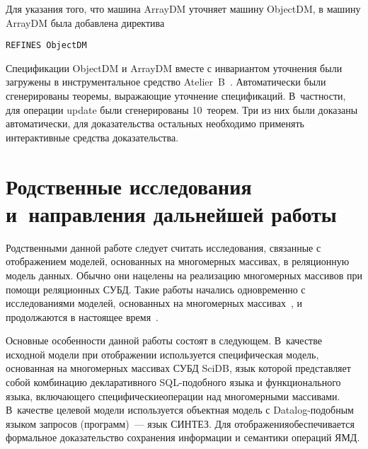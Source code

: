 \begin{multicols}{2}
                        \vspace*{-6pt}
        
        Для указания того, что машина {\sf ArrayDM} уточняет машину 
{\sf ObjectDM}, в машину {\sf ArrayDM} была добавлена директива
        \begin{verbatim}
REFINES ObjectDM
\end{verbatim}


        Спецификации {\sf ObjectDM} и {\sf ArrayDM} вместе с инвариантом 
уточнения были загружены в инструментальное средство 
        Atelier~B~\cite{22-stu}. Автоматически были сгенерированы теоремы, 
выражающие уточнение спецификаций. В~частности, для операции {\sf update} 
были сгенерированы 10~тео\-рем. Три из них были доказаны автоматически, 
для доказательства остальных необходимо применять интерактивные средства 
доказательства.

\vspace*{-9pt}
  
\section{Родственные исследования и~направления дальнейшей 
работы}

\vspace*{-2pt}

        Родственными данной работе следует считать исследования, связанные с 
отображением моделей, основанных на многомерных массивах, в реляционную 
модель данных. Обычно они нацелены на реализацию многомерных массивов 
при помощи реляционных СУБД. Такие работы начались одновременно с 
исследованиями моделей, основанных на многомерных массивах~\cite{5-stu}, и 
продолжаются в настоящее время~\cite{23-stu}.
        
        Основные особенности данной работы состоят в следующем. 
В~качестве исходной модели при отображении используется специфическая 
модель, основанная на многомерных массивах СУБД SciDB, язык которой 
представляет собой комбинацию декларативного SQL-по\-доб\-но\-го языка и 
функционального языка, включающего специфические\linebreak операции над 
многомерными массивами. В~качестве целевой модели используется объектная 
модель с Datalog-по\-доб\-ным языком запросов (программ)~--- язык СИНТЕЗ. 
Для отображения\linebreak обеспечивается формальное доказательство сохранения 
информации и семантики операций ЯМД.
        

\end{multicols}
